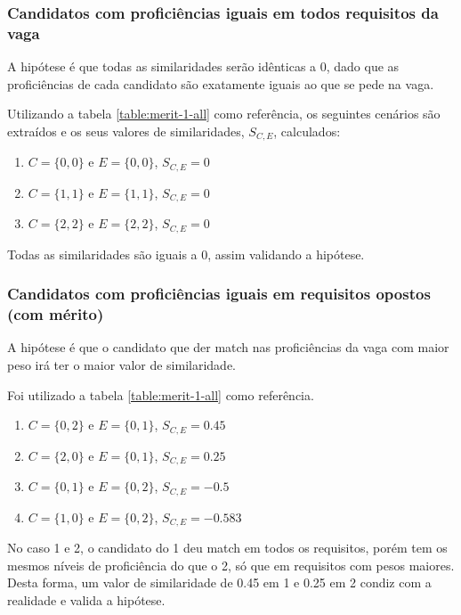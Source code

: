 \documentclass[preprint,12pt]{elsarticle}
\begin{document}
\subsubsection{Candidatos com proficiências iguais em todos requisitos da vaga}

A hipótese é que todas as similaridades serão idênticas a 0, dado que as proficiências de cada candidato são exatamente iguais ao que se pede na vaga. 

Utilizando a tabela \ref{table:merit-1-all} como referência, os seguintes cenários são extraídos e os seus valores de similaridades, $S_{C, E}$, calculados:

\begin{enumerate}
    \item $C = \{0,0\}$ e $E = \{0,0\}$, $S_{C,E} = 0$
    \item $C = \{1,1\}$ e $E = \{1,1\}$, $S_{C,E} = 0$
    \item $C = \{2,2\}$ e $E = \{2,2\}$, $S_{C,E} = 0$
\end{enumerate}

Todas as similaridades são iguais a 0, assim validando a hipótese.

\subsubsection{Candidatos com proficiências iguais em requisitos opostos (com mérito)}

A hipótese é que o candidato que der match nas proficiências da vaga com maior peso irá ter o maior valor de similaridade.

Foi utilizado a tabela \ref{table:merit-1-all} como referência.

\begin{enumerate}
    \item $C = \{0,2\}$ e $E = \{0,1\}$, $S_{C,E} = 0.45$
    \item $C = \{2,0\}$ e $E = \{0,1\}$, $S_{C,E} = 0.25$
    \item $C = \{0,1\}$ e $E = \{0,2\}$, $S_{C,E} = -0.5$
    \item $C = \{1,0\}$ e $E = \{0,2\}$, $S_{C,E} = -0.583$
\end{enumerate}

No caso 1 e 2, o candidato do 1 deu match em todos os requisitos, porém tem os mesmos níveis de proficiência do que o 2, só que em requisitos com pesos maiores. Desta forma, um valor de similaridade de 0.45 em 1 e 0.25 em 2 condiz com a realidade e valida a hipótese.
\end{document}
